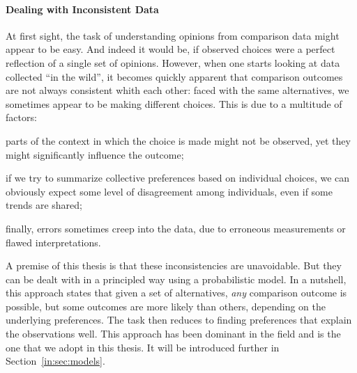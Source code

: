 \paragraph{Dealing with Inconsistent Data}
At first sight, the task of understanding opinions from comparison data might appear to be easy.
And indeed it would be, if observed choices were a perfect reflection of a single set of opinions.
However, when one starts looking at data collected ``in the wild'', it becomes quickly apparent that comparison outcomes are not always consistent whith each other:
faced with the same alternatives, we sometimes appear to be making different choices.
This is due to a multitude of factors:
\begin{enuminline}
\item parts of the context in which the choice is made might not be observed, yet they might significantly influence the outcome;
\item if we try to summarize collective preferences based on individual choices, we can obviously expect some level of disagreement among individuals, even if some trends are shared;
\item finally, errors sometimes creep into the data, due to erroneous measurements or flawed interpretations.
\end{enuminline}
A premise of this thesis is that these inconsistencies are unavoidable.
But they can be dealt with in a principled way using a probabilistic model.
In a nutshell, this approach states that given a set of alternatives, \emph{any} comparison outcome is possible, but some outcomes are more likely than others, depending on the underlying preferences.
The task then reduces to finding preferences that explain the observations well.
This approach has been dominant in the field and is the one that we adopt in this thesis.
It will be introduced further in Section~\ref{in:sec:models}.

